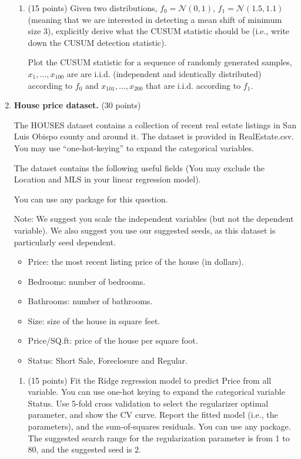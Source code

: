 \documentclass[twoside,10pt]{article}
\begin{document}
\begin{enumerate}
\begin{enumerate}
\item  (15 points)  Given two distributions, $f_0 = \mathcal{N}(0, 1)$, $f_1 = \mathcal{N}(1.5, 1.1)$ (meaning that we are interested in detecting a mean shift of minimum size 3), explicitly derive what the CUSUM statistic should be (i.e., write down the CUSUM detection statistic). 

Plot the CUSUM statistic for a sequence of randomly generated samples, $x_1, \ldots, x_{100}$ are are i.i.d. (independent and identically distributed) according to $f_0$ and $x_{101}, \ldots, x_{200}$  that are i.i.d. according to $f_1$.

\end{enumerate}

\clearpage

\item {\bf House price dataset.} (30 points)

The HOUSES dataset contains a collection of recent real estate listings in San Luis Obispo county and around it. The dataset is provided in RealEstate.csv. You may use ``one-hot-keying'' to expand the categorical variables.

The dataset contains the following useful fields (You may exclude the \textsf{Location} and \textsf{MLS} in your linear regression model). 

You can use any package for this question.

Note: We suggest you scale the independent variables (but not the dependent variable). We also
suggest you use our suggested seeds, as this dataset is particularly seed dependent.

\begin{itemize}
\item Price: the most recent listing price of the house (in dollars).
\item Bedrooms: number of bedrooms.
\item Bathrooms: number of bathrooms.
\item Size: size of the house in square feet.
\item Price/SQ.ft: price of the house per square foot.
\item Status: Short Sale, Foreclosure and Regular.
\end{itemize}

\begin{enumerate}

\item (15 points) Fit the Ridge regression model to predict \textsf{Price} from all variable. You can use one-hot keying to expand the categorical variable \textsf{Status}. Use 5-fold cross validation to select the regularizer optimal parameter, and show the CV curve. Report the fitted model (i.e., the parameters), and the sum-of-squares residuals.  You can use any package. The suggested search range for the regularization parameter is from 1 to 80, and the suggested seed is 2.
 

\end{enumerate}
\end{enumerate}
\end{document}

